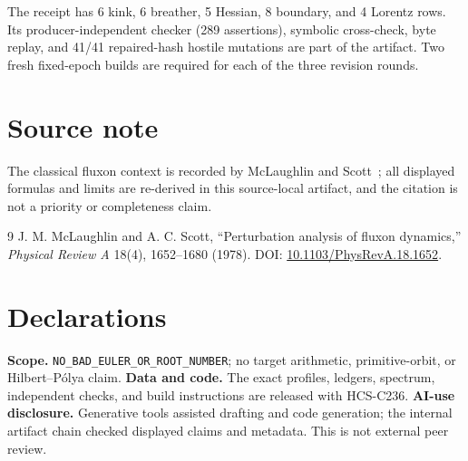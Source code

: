 \documentclass[10pt]{article}
\begin{document}
The receipt has 6 kink, 6 breather, 5 Hessian, 8 boundary, and 4 Lorentz rows.
Its producer-independent checker (289 assertions), symbolic cross-check, byte
replay, and 41/41 repaired-hash hostile mutations are part of the artifact.
Two fresh fixed-epoch builds
are required for each of the three revision rounds.
\fi

\section*{Source note}
The classical fluxon context is recorded by McLaughlin and Scott~\cite{ms};
all displayed formulas and limits are re-derived in this source-local
artifact, and the citation is not a priority or completeness claim.

\begin{thebibliography}{9}\small
\setlength{\itemsep}{0pt}\setlength{\parskip}{0pt}\setlength{\parsep}{0pt}
 J. M. McLaughlin and A. C. Scott, ``Perturbation analysis of
fluxon dynamics,'' \emph{Physical Review A} 18(4), 1652--1680 (1978).
DOI: \href{https://doi.org/10.1103/PhysRevA.18.1652}{10.1103/PhysRevA.18.1652}.
\end{thebibliography}

\section*{Declarations}
\textbf{Scope.} \texttt{NO\_BAD\_EULER\_OR\_ROOT\_NUMBER}; no target arithmetic,
primitive-orbit, or Hilbert--Pólya claim.  \textbf{Data and code.} The exact
profiles, ledgers, spectrum, independent checks, and build instructions are
released with HCS-C236.  \textbf{AI-use disclosure.} Generative tools assisted
drafting and code generation; the internal artifact chain checked displayed
claims and metadata.  This is not external peer review.
\end{document}
